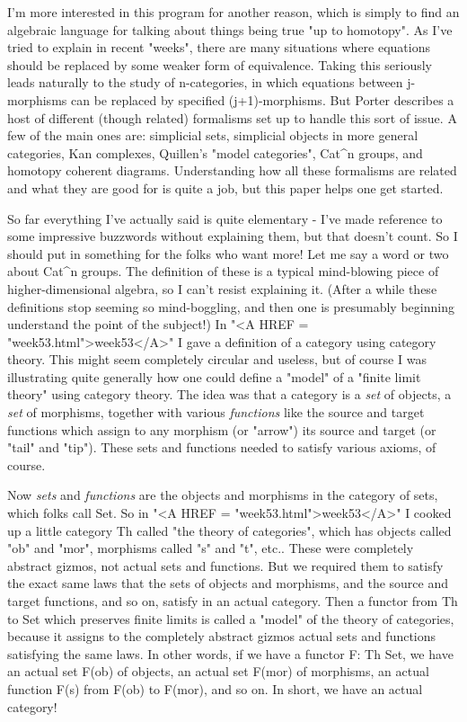 I'm more interested in this program for another reason, which is
simply to find an algebraic language for talking about things being
true "up to homotopy".  As I've tried to explain in recent "weeks",
there are many situations where equations should be replaced by some
weaker form of equivalence.  Taking this seriously leads naturally to
the study of n-categories, in which equations between j-morphisms can
be replaced by specified (j+1)-morphisms.  But Porter describes a host
of different (though related) formalisms set up to handle this sort of
issue.  A few of the main ones are: simplicial sets, simplicial
objects in more general categories, Kan complexes, Quillen's "model
categories", Cat^{n} groups, and homotopy coherent diagrams.
Understanding how all these formalisms are related and what they are
good for is quite a job, but this paper helps one get started.

So far everything I've actually said is quite elementary - I've made
reference to some impressive buzzwords without explaining them, but
that doesn't count.  So I should put in something for the folks who
want more!  Let me say a word or two about Cat^{n} groups.
The definition of these is a typical mind-blowing piece of
higher-dimensional algebra, so I can't resist explaining it.  (After a
while these definitions stop seeming so mind-boggling, and then one is
presumably beginning understand the point of the subject!)  In "<A
HREF = "week53.html">week53</A>" I gave a definition of a category
using category theory.  This might seem completely circular and
useless, but of course I was illustrating quite generally how one
could define a "model" of a "finite limit theory" using category
theory.  The idea was that a category is a \emph{set} of objects, a
\emph{set} of morphisms, together with various \emph{functions}
like the source and target functions which assign to any morphism (or
"arrow") its source and target (or "tail" and "tip").  These sets and
functions needed to satisfy various axioms, of course.

Now \emph{sets} and \emph{functions} are the objects and morphisms
in the category of sets, which folks call Set.  So in "<A HREF =
"week53.html">week53</A>" I cooked up a little category Th called "the
theory of categories", which has objects called "ob" and "mor",
morphisms called "s" and "t", etc..  These were completely abstract
gizmos, not actual sets and functions.  But we required them to
satisfy the exact same laws that the sets of objects and morphisms,
and the source and target functions, and so on, satisfy in an actual
category.  Then a functor from Th to Set which preserves finite limits
is called a "model" of the theory of categories, because it assigns to
the completely abstract gizmos actual sets and functions satisfying
the same laws.  In other words, if we have a functor 
F: Th \to  Set,
we have an actual set F(ob) of objects, an actual set F(mor) of
morphisms, an actual function F(s) from F(ob) to F(mor), and so on.
In short, we have an actual category!


